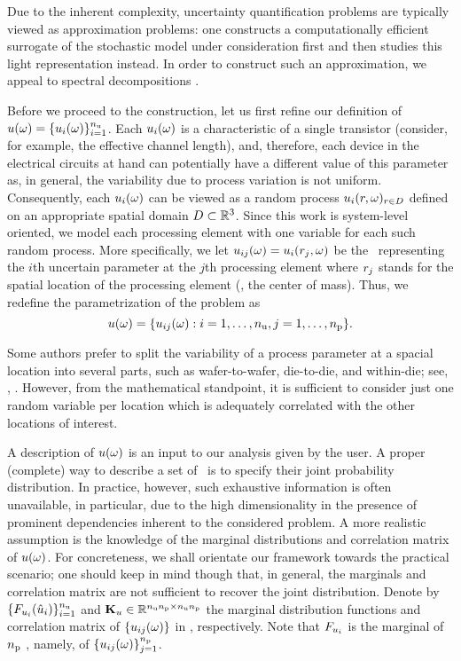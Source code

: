 Due to the inherent complexity, uncertainty quantification problems are typically viewed as approximation problems: one constructs a computationally efficient surrogate of the stochastic model under consideration first and then studies this light representation instead.
In order to construct such an approximation, we appeal to spectral decompositions \cite{maitre2010, janson1997, eldred2008}.

Before we proceed to the construction, let us first refine our definition of $u(\omega) = \{ u_i(\omega) \}_{i = 1}^{n_\text{u}}$.
Each $u_i(\omega)$ is a characteristic of a single transistor (consider, for example, the effective channel length), and, therefore, each device in the electrical circuits at hand can potentially have a different value of this parameter as, in general, the variability due to process variation is not uniform.
Consequently, each $u_i(\omega)$ can be viewed as a random process $u_i(r, \omega)_{r \in D}$ defined on an appropriate spatial domain $D \subset \mathbb{R}^3$.
Since this work is system-level oriented, we model each processing element with one variable for each such random process.
More specifically, we let $u_{ij}(\omega) = u_i(r_j, \omega)$ be the \rv\ representing the $i$th uncertain parameter at the $j$th processing element where $r_j$ stands for the spatial location of the processing element (\eg, the center of mass).
Thus, we redefine the parametrization of the problem as
\begin{equation} \elab{uncertain-parameters}
  \u(\o) = \{ \u_{ij}(\o): i = 1, \dots, \nparams, j = 1, \dots, \nprocs \}.
\end{equation}
\begin{remark}
Some authors prefer to split the variability of a process parameter at a spacial location into several parts, such as wafer-to-wafer, die-to-die, and within-die; see, \eg, \cite{juan2012}.
However, from the mathematical standpoint, it is sufficient to consider just one random variable per location which is adequately correlated with the other locations of interest.
\end{remark}

A description of $u(\omega)$ is an input to our analysis given by the user.
A proper (complete) way to describe a set of \rvs\ is to specify their joint probability distribution.
In practice, however, such exhaustive information is often unavailable, in particular, due to the high dimensionality in the presence of prominent dependencies inherent to the considered problem.
A more realistic assumption is the knowledge of the marginal distributions and correlation matrix of $u(\omega)$.
For concreteness, we shall orientate our framework towards the practical scenario; one should keep in mind though that, in general, the marginals and correlation matrix are not sufficient to recover the joint distribution.
Denote by $\{ F_{u_i}(\hat{u}_i) \}_{i = 1}^{n_\text{u}}$ and $\mathbf{K}_u \in \mathbb{R}^{{n_\text{u}} {n_\text{p}} \times {n_\text{u}} {n_\text{p}}}$ the marginal distribution functions and correlation matrix of $\{ u_{ij}(\omega) \}$ in , respectively.
Note that $F_{u_i}$ is the marginal of ${n_\text{p}}$ \rvs, namely, of $\{ u_{ij}(\omega) \}_{j = 1}^{n_\text{p}}$.

